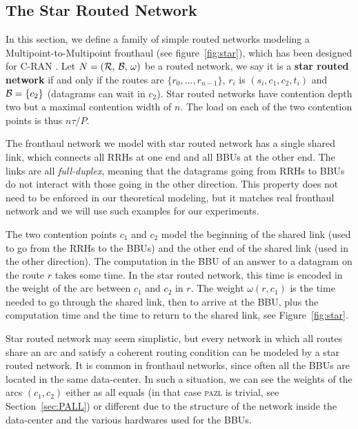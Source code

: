 \documentclass[a4paper,10pt]{journal}
\newcommand\pazl{\textsc{pazl}\xspace}
\begin{document}
    \subsection{The Star Routed Network} \label{sec:star_routed_network}
  
	In this section, we define a family of simple routed networks modeling a Multipoint-to-Multipoint fronthaul (see figure~\ref{fig:star}), which has been designed for C-RAN \cite{tayq2017real}. Let $N = (\cal{R},\,\cal{B},\,\omega)$ be a routed network, we say it is a \textbf{star routed network} if and only if the routes are $\{r_0,\dots,r_{n-1}\}$, $r_i$ is $(s_i,c_1,c_2,t_i)$ and ${\cal B} = \{ c_2 \}$ (datagrams can wait in $c_2$). Star routed networks have contention depth two but a maximal contention width of $n$. The load on each of the two contention points is thus $n\tau / P$.

	The fronthaul network we model with star routed network has a single shared link, which connects all RRHs at one end and all BBUs at the other end. The links are all \emph{full-duplex}, meaning that the datagrams going from RRHs to BBUs do not interact with those going in the other direction. 
	 This property does not need to be enforced in our theoretical modeling, but it matches real fronthaul network and we will use such examples for our experiments. 
	 
	The two contention points $c_1$ and $c_2$ model the beginning of the shared link (used to go from the RRHs to the BBUs) and the other end of the shared link (used in the other direction). 
	The computation in the BBU of an answer to a datagram on the route $r$ takes some time.
	In the star routed network, this time is encoded in the weight of the arc between $c_1$ and $c_2$ in $r$. The weight $\omega(r,c_1)$ is the time needed to go through the shared link, then to arrive at the BBU, plus the computation time and the time to return to the shared link, see Figure~\ref{fig:star}.


		Star routed network may seem simplistic, but every network in which all routes share an arc and satisfy a coherent routing condition can be modeled by a star routed network.
		It is common in fronthaul networks, since often all the BBUs are located in the same data-center. In such a situation, we can see the weights of the arcs $(c_1,c_2)$ either as all equals (in that case \pazl is trivial, see Section~\ref{sec:PALL}) or different due to the structure of the network inside the data-center and the various hardwares used for the BBUs. 
\end{document}
